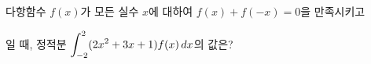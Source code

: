 다항함수 $f(x)$가 모든 실수 $x$에 대하여 $f(x)+f(-x)=0$을 만족시키고 \par\smallskip{}\par\smallskip\noindent 일 때, 정적분 $\displaystyle\int_{-2}^{2}(2x^2+3x+1)f(x)\mkern3mu dx$의 값은?
